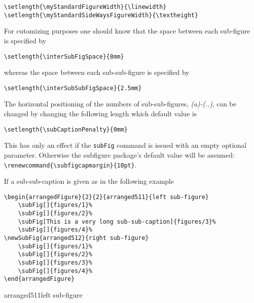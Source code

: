 \documentclass[12pt,a4paper]{article}
\newcommand{\comm}[1]{\texttt{#1}}
\begin{document}
\begin{verbatim} 
\setlength{\myStandardFigureWidth}{\linewidth}
\setlength{\myStandardSideWaysFigureWidth}{\textheight}
\end{verbatim}

For cutomizing purposes one should know that the space between 
each sub-figure is specified by

\begin{verbatim}
\setlength{\interSubFigSpace}{8mm}
\end{verbatim}

whereas the space between each sub-sub-figure is specified by

\begin{verbatim}
\setlength{\interSubSubFigSpace}{2.5mm}
\end{verbatim}

The horizontal positioning of the numbers of sub-sub-figures, 
\emph{(a)-(..)}, can be changed by changing the following length 
which default value is

\begin{verbatim}
\setlength{\subCaptionPenalty}{0mm}
\end{verbatim}

This has only an effect if the \comm{subFig} command is issued with 
an empty optional parameter. Otherwise the subfigure package's default
value will be assumed: \verb+\renewcommand{\subfigcapmargin}{10pt}+.

If a sub-sub-caption is given as in the following example

\begin{verbatim}
\begin{arrangedFigure}{2}{2}{arranged511}{left sub-figure}
    \subFig[]{figures/1}%
    \subFig[]{figures/2}%
    \subFig[This is a very long sub-sub-caption]{figures/3}%
    \subFig[]{figures/4}%
\newSubFig{arranged512}{right sub-figure}
    \subFig[]{figures/1}%
    \subFig[]{figures/2}%
    \subFig[]{figures/3}%
    \subFig[]{figures/4}%
\end{arrangedFigure}
\end{verbatim}

\begin{arrangedFigure}{2}{2}{arranged511}{left sub-figure}
\setlength{\subFigureAboveCaptionSpace}{7mm}
\end{arrangedFigure}
\setlength{\subFigureAboveCaptionSpace}{0mm}
\end{document}
